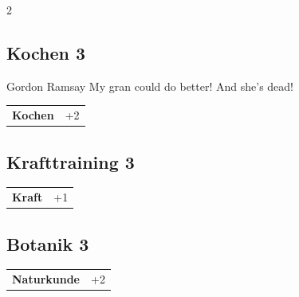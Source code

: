 \begin{multicols}{2}
\begin{tcolorbox}
\end{tcolorbox}

\begin{tcolorbox}
    \subsection*{Kochen \hfill \small{3 }}
    \tcblower


\begin{pquote}{Gordon Ramsay}
My gran could do better! And she’s dead!
\end{pquote}

\vspace{3mm}

\begin{tabular}{@{}ll@{}}
    \textbf{Kochen} & +2\\
\end{tabular}


\end{tcolorbox}

\begin{tcolorbox}
    \subsection*{Krafttraining \hfill \small{3 }}
    \tcblower




\begin{tabular}{@{}ll@{}}
    \textbf{Kraft} & +1\\
\end{tabular}


\end{tcolorbox}

\begin{tcolorbox}
    \subsection*{Botanik \hfill \small{3 }}
    \tcblower




\begin{tabular}{@{}ll@{}}
    \textbf{Naturkunde} & +2\\
\end{tabular}


\end{tcolorbox}
\end{multicols}
